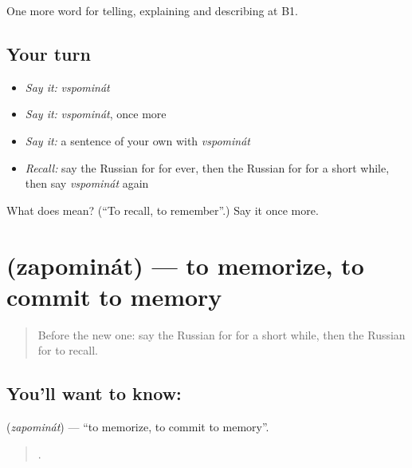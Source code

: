 \begin{grammarlens}[title={What you've built}]
One more word for telling, explaining and describing at B1.
\end{grammarlens}

\subsection*{Your turn}
\begin{itemize}
\raggedright
  \item \emph{Say it:} \emph{vspominát}
  \item \emph{Say it:} \emph{vspominát}, once more
  \item \emph{Say it:} a sentence of your own with \emph{vspominát}
  \item \emph{Recall:} say the Russian for for ever, then the Russian for for a short while, then say \emph{vspominát} again
\end{itemize}

\begin{tcolorbox}[breakable,colback=teal!4,colframe=teal!35!black,title={Before you move on}]
What does  mean? (\textquotedblleft{}To recall, to remember\textquotedblright{}.) Say it once more.
\end{tcolorbox}
\section[\texorpdfstring{\ru{запоминать} (zapominát)}{запоминать (zapominát)}]{ (zapominát) — to memorize, to commit to memory}

\label{lesson:RU-C278-zapominat}



\begin{quote}
Before the new one: say the Russian for for a short while, then the Russian for to recall.
\end{quote}

\subsection*{You'll want to know: }
\textbf{} (\emph{zapominát}) — \textquotedblleft{}to memorize, to commit to memory\textquotedblright{}.

\begin{quote}
   .
\end{quote}

